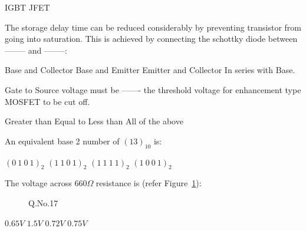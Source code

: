 \documentclass[a4, 12pt, addpoints]{exam}
\begin{document}
\begin{questions}
\begin{oneparchoices}
\choice IGBT
\choice JFET
\end{oneparchoices} 
\question The storage delay time can be reduced considerably by preventing transistor from going into saturation. This is achieved by connecting the schottky diode between -------- and --------:\\[0.3cm]
\begin{oneparchoices}
\choice Base and Collector
\choice Base and Emitter
\choice Emitter and Collector
\choice In series with Base. 
\end{oneparchoices}  
\question Gate to Source voltage must be ------- the threshold voltage for enhancement type MOSFET to be cut off.\\[0.3cm]
\begin{oneparchoices}
\choice Greater than
\choice Equal to
\choice Less than
\choice All of the above
\end{oneparchoices}  
\question An equivalent base 2 number of $(13)_{10}$ is:\\[0.3cm]
\begin{oneparchoices}
\choice $(0~1~0~1)_2$ 
\choice $(1~1~0~1)_2$
\choice $(1~1~1~1)_2$
\choice $(1~0~0~1)_2$
\end{oneparchoices} 
\question The voltage across $660 \Omega$ resistance is (refer Figure~\ref{fig:2}):
\begin{figure}[H]
\centering
{}
\caption{Q.No.17}
\label{fig:2}
\end{figure}
\begin{oneparchoices}
    \choice $0.65 V$
    \choice $1.5 V$
    \choice $0.72 V$
    \CorrectChoice $0.75 V$
    

\end{oneparchoices}
\end{questions}
\end{document}

